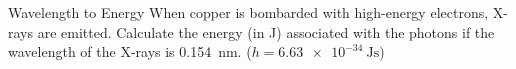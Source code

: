 \documentclass[notes=hide]{beamer}
\begin{document}
\begin{frame}[t]{Wavelength to Energy}
	When copper is bombarded with high-energy electrons, X-rays are emitted.
	Calculate the energy (in \si{\joule}) associated with the photons if the
	wavelength of the X-rays is \SI{0.154}{\nano\meter}. ($h =
	\SI{6.63e-34}{\joule\second}$)

\end{frame}

\end{document}
